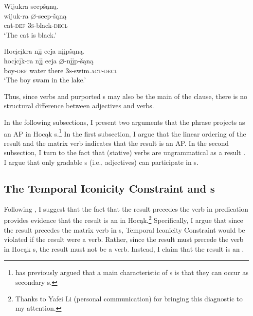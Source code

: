 \documentclass[output=paper]{LSP/langsci}
\begin{document}
\begin{exe}
\ex\label{ex:rosen:31}
\begin{xlist}

\ex \glll Wijukra seepšąną. \\
wijuk-ra {$\varnothing$}-seep-šąną\\
cat-\textsc{def} \textsc{3s}-black-\textsc{decl}\\
\glt `The cat is black.'


\ex \glll Hocįcįkra nįį eeja nįįpšąną.\\
hocįcįk-ra nįį eeja {$\varnothing$}-nįįp-šąną\\
boy-\textsc{def} water there \textsc{3s}-swim.\textsc{act}-\textsc{decl}\\
\glt `The boy swam in the lake.'

\end{xlist}
\end{exe}


Thus, since verbs and purported s may also be the main  of the clause, there is no structural difference between adjectives and verbs.

In the following subsections, I present two arguments that the  phrase projects as an AP in Hocąk s.\footnote{\citet{Baker2003} has previously argued that a main characteristic of s is that they can occur as secondary  s.} In the first subsection, I argue that the linear ordering of the result and the matrix verb indicates that the result is an AP. In the second subsection, I turn to the fact that (stative) verbs are ungrammatical as a result . I argue that only gradable s (i.e., adjectives) can participate in s. 

\subsection{The Temporal Iconicity Constraint and s}

Following \citet{Li1993}, I suggest that the fact that the result precedes the verb in  predication provides evidence that the result is an  in Hocąk.\footnote{Thanks to Yafei Li (personal communication) for bringing this diagnostic to my attention.} Specifically, I argue that since the result precedes the matrix verb in s,  Temporal Iconicity Constraint would be violated if the result were a verb. Rather, since the result must precede the verb in Hocąk s, the result must not be a verb. Instead, I claim that the result is an .
\end{document}
